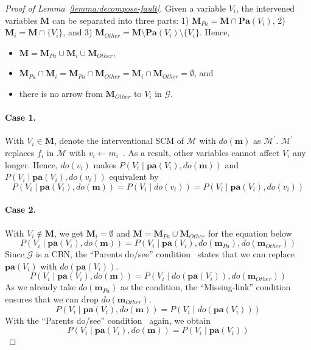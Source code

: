 \begin{proof}[Proof of Lemma~\ref{lemma:decompose-fault}]
	Given a variable $V_{i}$, the intervened variables $\mathbf{M}$ can be separated into three parts: 1) $\mathbf{M}_{Pa} = \mathbf{M} \cap \mathbf{Pa}(V_{i})$, 2) $\mathbf{M}_{i} = \mathbf{M} \cap \{V_{i}\}$, and 3) $\mathbf{M}_{Other} = \mathbf{M} \setminus \mathbf{Pa}(V_{i}) \setminus \{V_{i}\}$.
	Hence, 
	\begin{itemize}
		\item $\mathbf{M} = \mathbf{M}_{Pa} \cup \mathbf{M}_{i} \cup \mathbf{M}_{Other}$,
		\item $\mathbf{M}_{Pa} \cap \mathbf{M}_{i} =  \mathbf{M}_{Pa} \cap \mathbf{M}_{Other} = \mathbf{M}_{i}\cap \mathbf{M}_{Other} = \emptyset$, and
		\item there is no arrow from $\mathbf{M}_{Other}$ to $V_{i}$ in $\mathcal{G}$.
	\end{itemize}

    \paragraph{Case 1.}
    With $V_{i} \in \mathbf{M}$, denote the interventional SCM of $\mathcal{M}$ with $do(\mathbf{m})$ as $\mathcal{M}^{\prime}$.
    $\mathcal{M}^{\prime}$ replaces $f_{i}$ in $\mathcal{M}$ with $v_{i} \gets m_{i}$~\cite{Pearl:2009}.
    As a result, other variables cannot affect  $V_{i}$ any longer.
    Hence, $do(v_{i})$ makes $P(V_{i} \mid \mathbf{pa}(V_{i}), do(\mathbf{m}))$ and $P(V_{i} \mid \mathbf{pa}(V_{i}), do(v_{i}))$ equivalent by $$P(V_{i} \mid \mathbf{pa}(V_{i}), do(\mathbf{m})) = P(V_{i} \mid do(v_{i})) = P(V_{i} \mid \mathbf{pa}(V_{i}), do(v_{i}))$$

    \paragraph{Case 2.}
    With $V_{i} \notin \mathbf{M}$, we get $\mathbf{M}_{i} = \emptyset$ and $\mathbf{M} = \mathbf{M}_{Pa} \cup \mathbf{M}_{Other}$ for the equation below
    $$P(V_{i} \mid \mathbf{pa}(V_{i}), do(\mathbf{m})) = P(V_{i} \mid \mathbf{pa}(V_{i}), do(\mathbf{m}_{Pa}), do(\mathbf{m}_{Other}))$$
    Since $\mathcal{G}$ is a CBN, the ``Parents do/see'' condition~\cite{Bareinboim:2022} states that we can replace $\mathbf{pa}(V_{i})$ with $do(\mathbf{pa}(V_{i}))$.
	\begin{equation}
		P(V_{i} \mid \mathbf{pa}(V_{i}), do(\mathbf{m})) = P(V_{i} \mid do(\mathbf{pa}(V_{i})), do(\mathbf{m}_{Other}))
	\end{equation}
	As we already take $do(\mathbf{m}_{Pa})$ as the condition, the ``Missing-link'' condition~\cite{Bareinboim:2022} ensures that we can drop $do(\mathbf{m}_{Other})$.
	\begin{equation}
		P(V_{i} \mid \mathbf{pa}(V_{i}), do(\mathbf{m})) = P(V_{i} \mid do(\mathbf{pa}(V_{i})))
	\end{equation}
	With the ``Parents do/see'' condition~\cite{Bareinboim:2022} again,  we obtain
	\begin{equation}
		P(V_{i} \mid \mathbf{pa}(V_{i}), do(\mathbf{m})) = P(V_{i} \mid \mathbf{pa}(V_{i}))
	\end{equation}


\end{proof}
